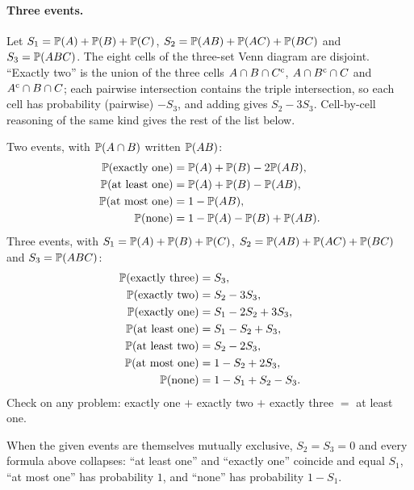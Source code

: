\paragraph{Three events.} Let $S_1 = \mathbb{P}(A) + \mathbb{P}(B) + \mathbb{P}(C)$,
$S_2 = \mathbb{P}(AB) + \mathbb{P}(AC) + \mathbb{P}(BC)$ and $S_3 = \mathbb{P}(ABC)$. The eight cells of the
three-set Venn diagram are disjoint. ``Exactly two'' is the union of the three cells
$A \cap B \cap C^{\mathrm{c}}$, $A \cap B^{\mathrm{c}} \cap C$ and $A^{\mathrm{c}} \cap B \cap C$; each pairwise
intersection contains the triple intersection, so each cell has probability (pairwise)
$- S_3$, and adding gives $S_2 - 3S_3$. Cell-by-cell reasoning of the same kind gives the
rest of the list below.

\begin{keyfact}
Two events, with $\mathbb{P}(A \cap B)$ written $\mathbb{P}(AB)$:
\begin{align*}
\mathbb{P}(\text{exactly one}) &= \mathbb{P}(A) + \mathbb{P}(B) - 2\mathbb{P}(AB), \\
\mathbb{P}(\text{at least one}) &= \mathbb{P}(A) + \mathbb{P}(B) - \mathbb{P}(AB), \\
\mathbb{P}(\text{at most one}) &= 1 - \mathbb{P}(AB), \\
\mathbb{P}(\text{none}) &= 1 - \mathbb{P}(A) - \mathbb{P}(B) + \mathbb{P}(AB).
\end{align*}
Three events, with $S_1 = \mathbb{P}(A) + \mathbb{P}(B) + \mathbb{P}(C)$,
$S_2 = \mathbb{P}(AB) + \mathbb{P}(AC) + \mathbb{P}(BC)$ and $S_3 = \mathbb{P}(ABC)$:
\begin{align*}
\mathbb{P}(\text{exactly three}) &= S_3, \\
\mathbb{P}(\text{exactly two}) &= S_2 - 3S_3, \\
\mathbb{P}(\text{exactly one}) &= S_1 - 2S_2 + 3S_3, \\
\mathbb{P}(\text{at least one}) &= S_1 - S_2 + S_3, \\
\mathbb{P}(\text{at least two}) &= S_2 - 2S_3, \\
\mathbb{P}(\text{at most one}) &= 1 - S_2 + 2S_3, \\
\mathbb{P}(\text{none}) &= 1 - S_1 + S_2 - S_3.
\end{align*}
Check on any problem: exactly one $+$ exactly two $+$ exactly three $=$ at least one.
\end{keyfact}

When the given events are themselves mutually exclusive, $S_2 = S_3 = 0$ and every formula
above collapses: ``at least one'' and ``exactly one'' coincide and equal $S_1$, ``at most
one'' has probability $1$, and ``none'' has probability $1 - S_1$.


